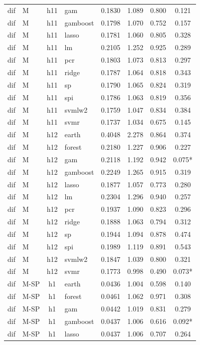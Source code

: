 \begin{ThreePartTable}
\begin{longtable}[t]{llclcccc}
dif & M & h11 & gam & 0.1830 & 1.089 & 0.800 & 0.121\\
dif & M & h11 & gamboost & 0.1798 & 1.070 & 0.752 & 0.157\\
dif & M & h11 & lasso & 0.1781 & 1.060 & 0.805 & 0.328\\
dif & M & h11 & lm & 0.2105 & 1.252 & 0.925 & 0.289\\
dif & M & h11 & pcr & 0.1803 & 1.073 & 0.813 & 0.297\\
dif & M & h11 & ridge & 0.1787 & 1.064 & 0.818 & 0.343\\
dif & M & h11 & sp & 0.1790 & 1.065 & 0.824 & 0.319\\
dif & M & h11 & spi & 0.1786 & 1.063 & 0.819 & 0.356\\
dif & M & h11 & svmlw2 & 0.1759 & 1.047 & 0.834 & 0.384\\
dif & M & h11 & svmr & 0.1737 & 1.034 & 0.675 & 0.145\\
\addlinespace
dif & M & h12 & earth & 0.4048 & 2.278 & 0.864 & 0.374\\
dif & M & h12 & forest & 0.2180 & 1.227 & 0.906 & 0.227\\
dif & M & h12 & gam & 0.2118 & 1.192 & 0.942 & 0.075*\\
dif & M & h12 & gamboost & 0.2249 & 1.265 & 0.915 & 0.319\\
dif & M & h12 & lasso & 0.1877 & 1.057 & 0.773 & 0.280\\
dif & M & h12 & lm & 0.2304 & 1.296 & 0.940 & 0.257\\
dif & M & h12 & pcr & 0.1937 & 1.090 & 0.823 & 0.296\\
dif & M & h12 & ridge & 0.1888 & 1.063 & 0.794 & 0.312\\
dif & M & h12 & sp & 0.1944 & 1.094 & 0.878 & 0.474\\
dif & M & h12 & spi & 0.1989 & 1.119 & 0.891 & 0.543\\
dif & M & h12 & svmlw2 & 0.1847 & 1.039 & 0.800 & 0.321\\
dif & M & h12 & svmr & 0.1773 & 0.998 & 0.490 & 0.073*\\
\addlinespace
dif & M-SP & h1 & earth & 0.0436 & 1.004 & 0.598 & 0.140\\
dif & M-SP & h1 & forest & 0.0461 & 1.062 & 0.971 & 0.308\\
dif & M-SP & h1 & gam & 0.0442 & 1.019 & 0.831 & 0.279\\
dif & M-SP & h1 & gamboost & 0.0437 & 1.006 & 0.616 & 0.092*\\
dif & M-SP & h1 & lasso & 0.0437 & 1.006 & 0.707 & 0.264\\

\end{longtable}
\end{ThreePartTable}
